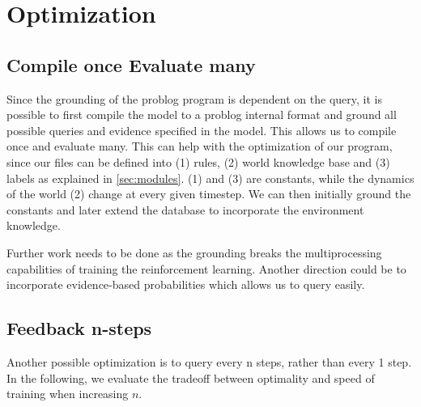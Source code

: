 \section{Optimization} \label{optimality} 



\subsection{Compile once Evaluate many}
Since the grounding of the problog program is dependent on the query, it is possible to first compile the model 
to a problog internal format and ground all possible queries and evidence specified in the model. This allows us 
to compile once and evaluate many. This can help with the optimization of our program, since our files can be defined into 
(1) rules, (2) world knowledge base and (3) labels as explained in \ref{sec:modules}. (1) and (3) are constants, while the dynamics 
of the world (2) change at every given timestep. We can then initially ground the constants and later 
extend the database to incorporate the environment knowledge. 
 
Further work needs to be done as the grounding breaks the multiprocessing capabilities of training the reinforcement learning. 
Another direction could be to incorporate evidence-based probabilities which allows us to query \dio easily.

\subsection{Feedback n-steps} 
Another possible optimization is to query \dio every n steps, rather than every 1 step. In the 
following, we evaluate the tradeoff between optimality and speed of training when increasing $n$. 


